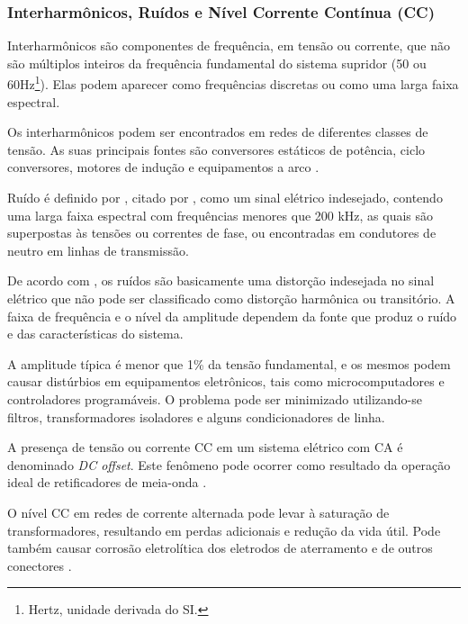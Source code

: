 \subsubsection{Interharmônicos, Ruídos e Nível Corrente Contínua (CC)}\label{qeeIRNCC}
%
\par
Interharmônicos são componentes de frequência, em tensão ou corrente, que não são múltiplos inteiros da frequência fundamental do sistema supridor (50 ou 60Hz\footnote{Hertz, unidade derivada do \ac{SI}.}). Elas podem aparecer como frequências discretas ou como uma larga faixa espectral.
\par
Os interharmônicos podem ser encontrados em redes de diferentes classes de tensão. As suas principais fontes são conversores estáticos de potência, ciclo conversores, motores de indução e equipamentos a arco \cite{DEL03}.
\par
Ruído é definido por \cite{OLIVE}, citado por \cite{DEL03}, como um sinal elétrico indesejado, contendo uma larga faixa espectral com frequências menores que 200 kHz, as quais são superpostas às tensões ou correntes de fase, ou encontradas em condutores de neutro em linhas de transmissão.
\par
De acordo com \cite{DUG96}, os ruídos são basicamente uma distorção indesejada no sinal elétrico que não pode ser classificado como distorção harmônica ou transitório. A faixa de frequência e o nível da amplitude dependem da fonte que produz o ruído e das características do sistema. 
\par
A amplitude típica é menor que 1\% da tensão fundamental, e os mesmos podem causar distúrbios em equipamentos eletrônicos, tais como microcomputadores e controladores programáveis. O problema pode ser minimizado utilizando-se filtros, transformadores isoladores e alguns condicionadores de linha.
\par
A presença de tensão ou corrente \ac{CC} em um sistema elétrico com \ac{CA} é denominado \emph{DC offset}. Este fenômeno pode ocorrer como resultado da operação ideal de retificadores de meia-onda \cite{OLIVE}.
\par
O nível CC em redes de corrente alternada pode levar à saturação de transformadores, resultando em perdas adicionais e redução da vida útil. Pode também causar corrosão eletrolítica dos eletrodos de aterramento e de outros conectores \cite{DEL03}.
